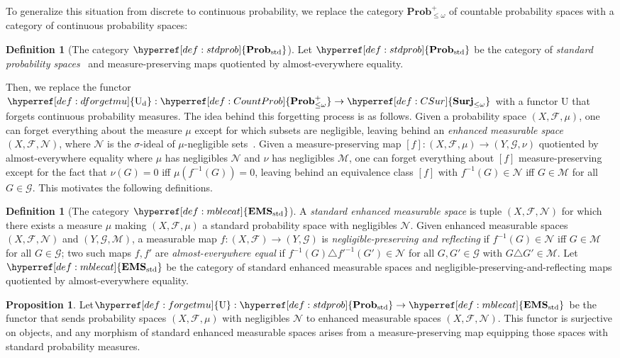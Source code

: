 \documentclass[
  sigconf,
  screen, ]{acmart}
\makeatletter
\theoremstyle{definition}
\newtheorem{definition}[theorem]{Definition}
\newtheorem{proposition}[theorem]{Proposition}
\newcommand\calF{\mathcal F}
\newcommand\calG{\mathcal G}
\newcommand\calM{\mathcal M}
\newcommand\calN{\mathcal N}
\newcommand{\labelword}[2]{\phantomsection
  #1\def\@currentlabel{\unexpanded{#1}}\label{#2}}
\newcommand\nref[2]{\hyperref[#1]{#2}} \newcommand\checkhigh{{\huge{\color{red}\textbf{TODO: check}}}}
\newcommand\texforgetmu{\mathrm{U}}
\newcommand\forgetmu{{\nref{def:forgetmu}{\texforgetmu}}}
\newcommand\dforgetmu{{\nref{def:dforgetmu}{\mathrm{U}_{\rm d}}}}
\newcommand\texStdProb{\mathbf{Prob}_{\rm std}}
\newcommand\StdProb{{\nref{def:stdprob}{\texStdProb}}}
\newcommand\texStdMble{\mathbf{EMS}_{\rm std}}
\newcommand\StdMble{{\nref{def:mblecat}{\texStdMble}}}
\newcommand\CountProb{{\nref{def:CountProb}{\mathbf{Prob}_{\le\omega}^+}}}
\newcommand\CSur{{\nref{def:CSur}{\mathbf{Surj}_{\le\omega}}}}
\makeatother
\begin{document}
To generalize this situation from discrete to continuous probability,
we replace the category $\CountProb$ of countable probability spaces
with a category of continuous probability spaces:

\begin{definition}[The category $\StdProb$] \label{def:stdprob}
Let $\StdProb$ be the category
of \emph{standard probability spaces}~\citep{rohlin1949fundamental}
and measure-preserving maps
quotiented by almost-everywhere equality.
\end{definition}

Then, we replace the functor
$\dforgetmu : \CountProb\to\CSur$
with a functor $\forgetmu$ that forgets
continuous probability measures.
The idea behind this forgetting process is as follows.
Given a probability space $(X,\calF,\mu)$,
one can forget everything about the measure $\mu$
except for which subsets are negligible,
leaving behind an \emph{enhanced measurable space} $(X,\calF,\calN)$,
where $\calN$ is the $\sigma$-ideal of $\mu$-negligible sets~\cite[Definition 4.4]{pavlov2022gelfand}.
    Given a measure-preserving map $[f] : (X,\calF,\mu)\to (Y,\calG,\nu)$
    quotiented by almost-everywhere equality
    where $\mu$ has negligibles $\calN$ and $\nu$ has negligibles $\calM$,
    one can forget everything about $[f]$ measure-preserving except
    for the fact that
    $\nu(G) = 0$ iff $\mu(f^{-1}(G)) = 0$,
    leaving behind an equivalence class
    $[f]$
    with $f^{-1}(G)\in\calN$ iff $G\in\calM$
    for all $G\in\calG$.
This motivates the following definitions.

\begin{definition}[The category $\StdMble$] \label{def:mblecat}
A \emph{standard enhanced measurable space}
is tuple $(X,\calF,\calN)$ for which there
exists a measure $\mu$ making $(X,\calF,\mu)$ a standard probability space
with negligibles $\calN$.
Given enhanced measurable spaces $(X,\calF,\calN)$
and $(Y,\calG,\calM)$,
a measurable map $f : (X,\calF)\to(Y,\calG)$
is \emph{negligible-preserving and reflecting}
if $f^{-1}(G)\in\calN$ iff $G\in\calM$ for all $G\in\calG$;
two such maps $f,f'$ are \emph{almost-everywhere equal}
if $f^{-1}(G)\triangle f'^{-1}(G')\in\calN$ for all $G,G'\in\calG$ with $G\triangle G'\in\calM$.
Let $\StdMble$ be the category of
standard enhanced measurable spaces
and negligible-preserving-and-reflecting maps quotiented by almost-everywhere equality.
\end{definition}

\begin{proposition}
\labelword{Let}{def:forgetmu} $\forgetmu : \StdProb\to\StdMble$
be the functor that sends probability spaces $(X,\calF,\mu)$
with negligibles $\calN$ to enhanced measurable spaces $(X,\calF,\calN)$.
This functor is surjective on objects,
and any morphism of standard enhanced measurable spaces
arises from a measure-preserving map equipping
those spaces with standard probability measures.
\end{proposition}
\end{document}
